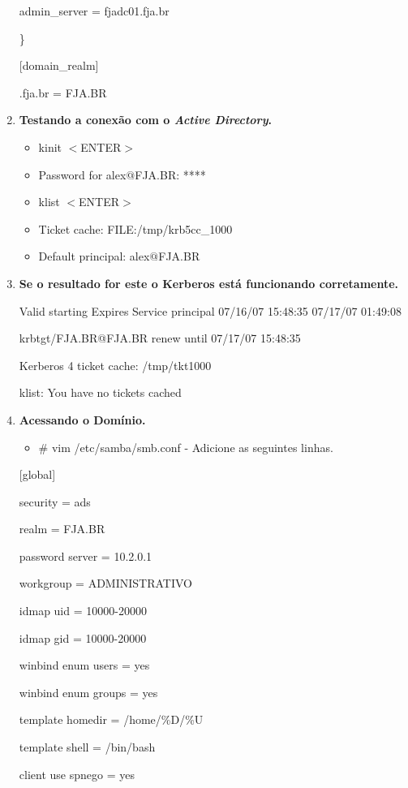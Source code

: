 \begin{enumerate}
      	admin\_server = fjadc01.fja.br

     	\}

		[domain\_realm]

		.fja.br = FJA.BR

	\item \textbf {Testando a conexão com o \textit{Active Directory}.}
		\begin{itemize}
			\item {kinit $<$ENTER$>$}
			\item {Password for alex$@$FJA.BR: ****}
			\item {klist $<$ENTER$>$}
			\item {Ticket cache: FILE:/tmp/krb5cc\_1000}
			\item {Default principal: alex$@$FJA.BR}
		\end{itemize}

	\item \textbf {Se o resultado for este o Kerberos está funcionando corretamente.}

		Valid starting Expires Service principal 07/16/07 15:48:35  07/17/07 01:49:08  

		krbtgt/FJA.BR@FJA.BR renew until 07/17/07 15:48:35
	
		Kerberos 4 ticket cache: /tmp/tkt1000
	
		klist: You have no tickets cached

	\item \textbf{Acessando o Domínio.}
		\begin{itemize}
			\item {\# vim /etc/samba/smb.conf} -  Adicione as seguintes linhas.
		\end{itemize}

		[global]

        	security = ads
		
        	realm = FJA.BR

        	password server = 10.2.0.1

        	workgroup = ADMINISTRATIVO

        	idmap uid = 10000-20000

        	idmap gid = 10000-20000

        	winbind enum users = yes

        	winbind enum groups = yes

        	template homedir = /home/\%D/\%U

        	template shell = /bin/bash

        	client use spnego = yes


\end{enumerate}
